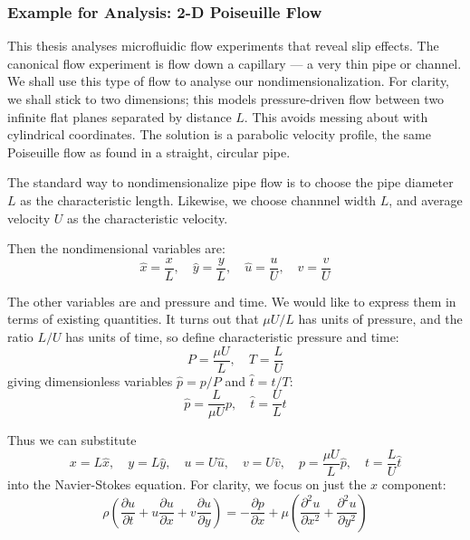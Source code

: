\documentclass[a4paper]{report}
\begin{document}
\subsubsection*{Example for Analysis: 2-D Poiseuille Flow}
This thesis analyses microfluidic flow experiments that reveal slip effects.  The canonical flow experiment is flow down a capillary --- a very thin pipe or channel.  
We shall use this type of flow to analyse our nondimensionalization.  For clarity, we shall stick to two dimensions; this models pressure-driven flow between two infinite flat planes separated by distance $L$.  This avoids messing about with cylindrical coordinates.  The solution is a parabolic velocity profile, the same Poiseuille flow as found in a straight, circular pipe.

The standard way to nondimensionalize pipe flow is to choose the pipe diameter $L$ as the characteristic length.  Likewise, we choose channnel width $L$, and average velocity $U$ as the characteristic velocity.


Then the nondimensional variables are:
\begin{equation}
\hat{x} = \frac{x}{L}, \quad \hat{y} = \frac{y}{L}, \quad
 \hat{u} = \frac{u}{U}, \quad \hat{v} = \frac{v}{U}
\end{equation}

The other variables are and pressure and time.  We would like to express them in terms of existing quantities.
It turns out that $ \mu U / L $ has units of pressure, and the ratio $L /U$ has units of time, so define characteristic pressure and time:
\begin{equation}
P = \frac{\mu U}{L}, \quad T = \frac{L}{U}
\end{equation}
giving dimensionless variables $\hat{p} = p/P$ and $\hat{t}=t/T$:
\begin{equation}
\hat{p} = \frac{L}{\mu U} p, \quad \hat{t} = \frac{U}{L}t
\end{equation}

Thus we can substitute
\begin{equation}
x = L\hat{x}, \quad y = L\hat{y}, \quad u = U \hat{u}, \quad v = U \hat{v}, 
\quad p = \frac{\mu U}{L}\hat{p}, \quad t = \frac{L}{U}\hat{t}
\end{equation}
into the Navier-Stokes equation.  For clarity, we focus on just the $x$ component:
\begin{equation}
\rho \left( \frac{\partial u}{\partial t} +
 u \frac{\partial u}{\partial x} + v\frac{\partial u}{\partial y} \right) =
 - \frac{\partial p}{\partial x} + 
\mu \left( \frac{\partial^2 u}{\partial x^2} + \frac{\partial^2 u}{\partial y^2} \right)
\end{equation}
\end{document}
